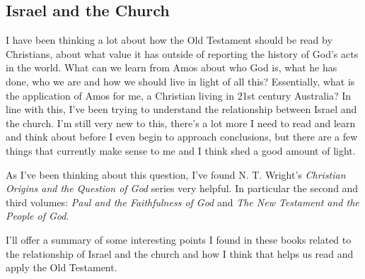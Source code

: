 \subsection{Israel and the Church}

I have been thinking a lot about how the Old Testament should be read by
Christians, about what value it has outside of reporting the history of God's
acts in the world. What can we learn from Amos about who God is, what he has
done, who we are and how we should live in light of all this? Essentially, what
is the application of Amos for me, a Christian living in 21st century Australia?
In line with this, I've been trying to understand the relationship between
Israel and the church. I'm still very new to this, there's a lot more I need to
read and learn and think about before I even begin to approach conclusions, but
there are a few things that currently make sense to me and I think shed a good
amount of light.

As I've been thinking about this question, I've found N. T. Wright's
\textit{Christian Origins and the Question of God} series very helpful. In
particular the second and third volumes: \textit{Paul and the Faithfulness of
God} and \textit{The New Testament and the People of God}.

I'll offer a summary of some interesting points I found in these books related
to the relationship of Israel and the church and how I think that helps us read
and apply the Old Testament.

